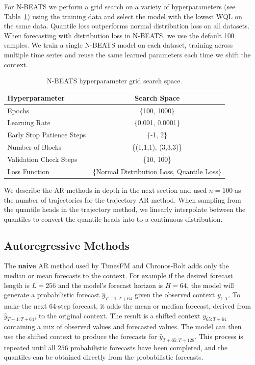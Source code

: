 \documentclass{article}
\begin{document}
For N-BEATS we perform a grid search on a variety of hyperparameters (see Table~\ref{tab:grid_search}) using the training data and select the model with the lowest WQL on the same data. 
Quantile loss outperforms normal distribution loss on all datasets. 
When forecasting with distribution loss in N-BEATS, we use the default 100 samples.
We train a single N-BEATS model on each dataset, training across multiple time series and reuse the same learned parameters each time we shift the context.

\begin{table}[ht]
\centering
\caption{N-BEATS hyperparameter grid search space.}
\label{tab:grid_search}
\begin{tabular}{lc}
\toprule
{Hyperparameter} & {Search Space} \\
 \midrule
{Epochs} & {\{100, 1000\}} \\
{Learning Rate} & {\{0.001, 0.0001\}} \\
{Early Stop Patience Steps} & {\{-1, 2\}} \\
{Number of Blocks} & {\{(1,1,1), (3,3,3)\}} \\
{Validation Check Steps} & {\{10, 100\}} \\
{Loss Function} & {\{Normal Distribution Loss, Quantile Loss\}} \\
\bottomrule
\end{tabular}
\end{table}

We describe the AR methods in depth in the next section and used $n=100$ as the number of trajectories for the trajectory AR method.
When sampling from the quantile heads in the trajectory method, we linearly interpolate between the quantiles to convert the quantile heads into to a continuous distribution.

\subsection{Autoregressive Methods}\label{sec:appendix:ar_methods}

The \textbf{naive} AR method used by TimesFM and Chronos-Bolt adds only the median or mean forecasts to the context.
For example if the desired forecast length is $L=256$ and the model's forecast horizon is $H=64$, the model will generate a probabilistic forecast $\hat{y}_{T+1:T+64}$ given the observed context $y_{1:T}$. 
To make the next 64-step forecast, it adds the mean or median forecast, derived from $\hat{y}_{T+1:T+64}$, to the original context.
The result is a shifted context $y_{65:T+64}$ containing a mix of observed values and forecasted values.
The model can then use the shifted context to produce the forecasts for $\hat{y}_{T+65:T+128}$.
This process is repeated until all $256$ probabilistic forecasts have been completed, and the quantiles can be obtained directly from the probabilistic forecasts.
\end{document}
